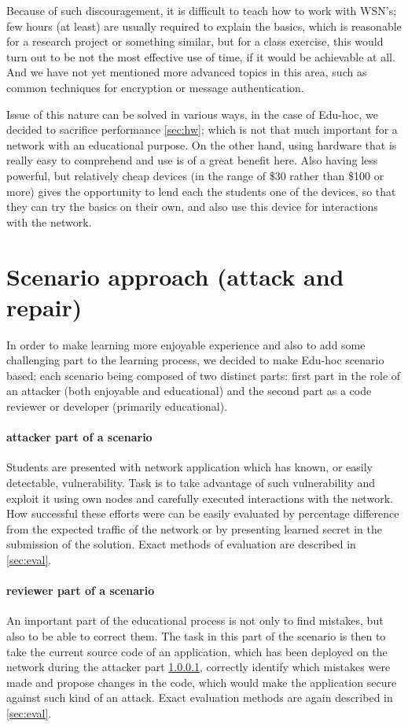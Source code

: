 \documentclass[
  print, %
  Table,   %
  nolof,     %
  nolot,     %
           oneside
]{fithesis3}
\begin{document}
  Because of such discouragement, it is difficult to teach how to
  work with WSN’s; few hours (at least) are usually required
  to explain the basics, which is reasonable for a research project or
  something similar, but for a class exercise, this would turn out to be
  not the most effective use of time, if it would be achievable at all. And
  we have not yet mentioned more advanced topics in this area, such as
  common techniques for encryption or message authentication.

  Issue of this nature can be solved in various ways,
  in the case of Edu-hoc, we decided to sacrifice performance \ref{sec:hw}; which is not that much important for a network with an educational purpose. On the other hand, using hardware that is really easy to comprehend and use is of a great benefit here. Also having less powerful, but relatively cheap devices (in the range of \$30 rather than \$100 or more) gives the opportunity to lend each the students one of the devices, so that they can try the basics on their own, and also use this device for interactions with the network.

  \section{Scenario approach (attack and repair)}
  In order to make learning more enjoyable experience and also to add some challenging part to the learning process, we decided to make Edu-hoc scenario based; each scenario being composed of two distinct parts: first part in the role of an attacker (both enjoyable and educational) and the second part as a code reviewer or developer (primarily educational).

  \paragraph{attacker part of a scenario}\label{par:att}
    Students are presented with network application which has known, or easily detectable, vulnerability. Task is to take advantage of such vulnerability and exploit it using own nodes and carefully executed interactions with the network. How successful these efforts were can be easily evaluated by percentage difference from the expected traffic of the network or by presenting learned secret in the submission of the solution. Exact methods of evaluation are described in \ref{sec:eval}.

  \paragraph{reviewer part of a scenario}
    An important part of the educational process is not only to find mistakes, but also to be able to correct them. The task in this part of the scenario is then to take the current source code of an application, which has been deployed on the network during the attacker part \ref{par:att}, correctly identify which mistakes were made and propose changes in the code, which would make the application secure against such kind of an attack. Exact evaluation methods are again described in \ref{sec:eval}.
\end{document}
